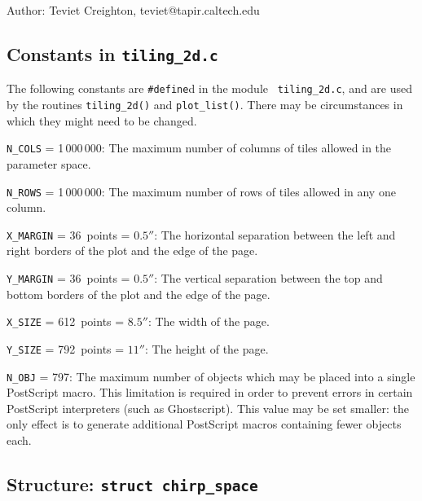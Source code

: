 \begin{description}
\item{Author:}
  Teviet Creighton, teviet@tapir.caltech.edu
\end{description}


\clearpage
\subsection{Constants in {\tt tiling\_2d.c}}
\label{ss:tileconst}

The following constants are {\tt \#define}d in the module {\tt
tiling\_2d.c}, and are used by the routines {\tt tiling\_2d()} and
{\tt plot\_list()}.  There may be circumstances in which they might
need to be changed.

\begin{description}
\item{\tt N\_COLS} = 1\,000\,000:
  The maximum number of columns of tiles allowed in the parameter
  space.

\item{\tt N\_ROWS} = 1\,000\,000:
  The maximum number of rows of tiles allowed in any one column.

\item{\tt X\_MARGIN} = 36~points = $0.5''$:
  The horizontal separation between the left and right borders of the
  plot and the edge of the page.

\item{\tt Y\_MARGIN} = 36~points = $0.5''$:
  The vertical separation between the top and bottom borders of the
  plot and the edge of the page.

\item{\tt X\_SIZE} = 612~points = $8.5''$:
  The width of the page.

\item{\tt Y\_SIZE} = 792~points = $11''$:
  The height of the page.

\item{\tt N\_OBJ} = 797:
   The maximum number of objects which may be placed into a single
   PostScript macro.  This limitation is required in order to prevent
   errors in certain PostScript interpreters (such as Ghostscript).
   This value may be set smaller: the only effect is to generate
   additional PostScript macros containing fewer objects each.
\end{description}


\clearpage
\subsection{Structure: {\tt struct chirp\_space}}
\label{ss:chirp_space}

